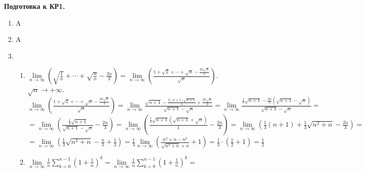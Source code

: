 \documentclass[a4paper]{article}
\begin{document}
\newcommand\HeaderDZ[1]{
\begin{center}
		\textbf{Подготовка к КР#1.}
\end{center}
\vspace{-\baselineskip}
\bigskip
\bigskip
}



\renewcommand{\labelenumii}{\arabic{enumii})}
\renewcommand{\labelenumiii}{\roman{enumiii})}

\HeaderDZ{1}

\begin{enumerate}
    \item A
    \item A
    \item 
    \begin{enumerate}
        \item $\lim\limits_{n\rightarrow\infty}(\sqrt{\frac{1}{n}} + \cdots + \sqrt{\frac{n}{n}} - \frac{2n}{3}) = \lim\limits_{n\rightarrow\infty}(\frac{1 + \sqrt{2} + \cdots + \sqrt{n} - \frac{2n\sqrt{n}}{3}}{\sqrt{n}})$. $\sqrt{n}\rightarrow+\infty$.\\
        $\lim\limits_{n\rightarrow\infty}(\frac{1 + \sqrt{2} + \cdots + \sqrt{n} - \frac{2n\sqrt{n}}{3}}{\sqrt{n}}) = \lim\limits_{n\rightarrow\infty}\frac{\sqrt{n+1} - \frac{2(n+1)\sqrt{n+1}}{3} + \frac{2n\sqrt{n}}{3}}{\sqrt{n+1} - \sqrt{n}} = \lim\limits_{n\rightarrow\infty}\frac{\frac{1}{3}\sqrt{n+1}-\frac{2n}{3}(\sqrt{n+1} - \sqrt{n})}{\sqrt{n+1}-\sqrt{n}}=$\\
        $= \lim\limits_{n\rightarrow\infty}(\frac{\frac{1}{3}\sqrt{n+1}}{\sqrt{n+1}-\sqrt{n}} - \frac{2n}{3}) = \lim\limits_{n\rightarrow\infty}(\frac{\frac{1}{3}\sqrt{n+1}(\sqrt{n+1} + \sqrt{n})}{1} - \frac{2n}{3}) = \lim\limits_{n\rightarrow\infty}(\frac{1}{3}(n+1) + \frac{1}{3}\sqrt{n^2 + n} - \frac{2n}{3}) = $\\
        $=\lim\limits_{n\rightarrow\infty}(\frac{1}{3}\sqrt{n^2 + n} - \frac{n}{3} + \frac{1}{3}) = \frac{1}{3}\lim\limits_{n\rightarrow\infty}(\frac{n^2 + n - n^2}{\sqrt{n^2 + n} + n} + 1) = \frac{1}{3}\cdot(\frac{1}{2} + 1) = \frac{1}{2}$ 
        \item $\lim\limits_{n\rightarrow\infty}\frac{1}{n}\sum_{k=0}^{n-1}(1 + \frac{1}{n})^k = \lim\limits_{n\rightarrow\infty}\frac{1}{n}\sum_{k=0}^{n-1}(1+\frac{1}{n})^k = $
    \end{enumerate}
\end{enumerate}
\end{document}
